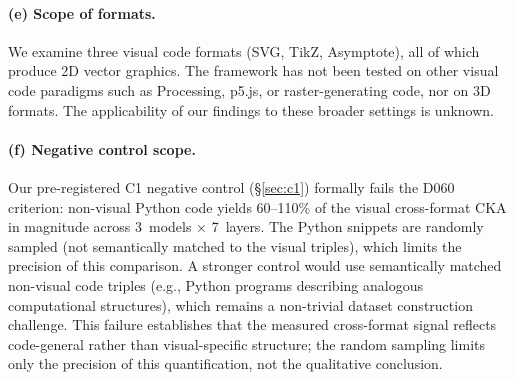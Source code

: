 \paragraph{(e) Scope of formats.}
We examine three visual code formats (SVG, TikZ, Asymptote), all of which produce 2D vector graphics.
The framework has not been tested on other visual code paradigms such as Processing, p5.js, or raster-generating code, nor on 3D formats.
The applicability of our findings to these broader settings is unknown.

\paragraph{(f) Negative control scope.}
Our pre-registered C1 negative control (\S\ref{sec:c1}) formally fails the D060 criterion: non-visual Python code yields 60--110\% of the visual cross-format CKA in magnitude across 3~models $\times$ 7~layers.
The Python snippets are randomly sampled (not semantically matched to the visual triples), which limits the precision of this comparison.
A stronger control would use semantically matched non-visual code triples (e.g., Python programs describing analogous computational structures), which remains a non-trivial dataset construction challenge.
This failure establishes that the measured cross-format signal reflects code-general rather than visual-specific structure; the random sampling limits only the precision of this quantification, not the qualitative conclusion.
